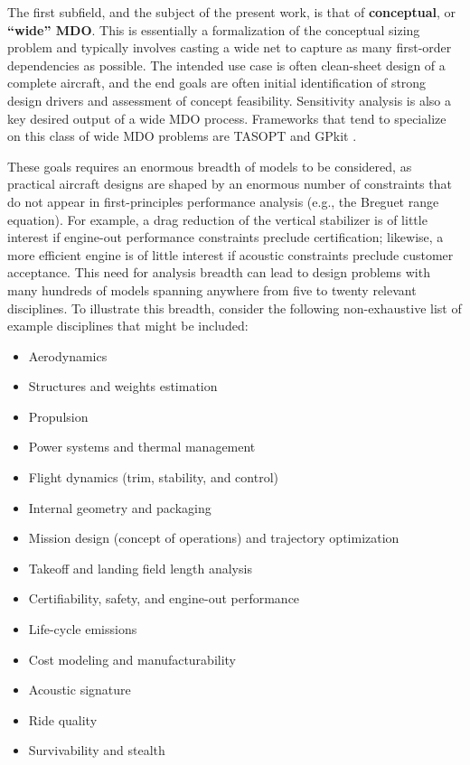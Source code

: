 \documentclass[12pt,vi,oneside,table]{report}
\begin{document}
    The first subfield, and the subject of the present work, is that of \textbf{conceptual}, or \textbf{``wide'' MDO}. This is essentially a formalization of the conceptual sizing problem and typically involves casting a wide net to capture as many first-order dependencies as possible. The intended use case is often clean-sheet design of a complete aircraft, and the end goals are often initial identification of strong design drivers and assessment of concept feasibility. Sensitivity analysis is also a key desired output of a wide MDO process. Frameworks that tend to specialize on this class of wide MDO problems are TASOPT \cite{drela_tasopt_2010} and GPkit \cite{gpkit}.

    These goals requires an enormous breadth of models to be considered, as practical aircraft designs are shaped by an enormous number of constraints that do not appear in first-principles performance analysis (e.g., the Breguet range equation). For example, a drag reduction of the vertical stabilizer is of little interest if engine-out performance constraints preclude certification; likewise, a more efficient engine is of little interest if acoustic constraints preclude customer acceptance. This need for analysis breadth can lead to design problems with many hundreds of models spanning anywhere from five to twenty relevant disciplines. To illustrate this breadth, consider the following non-exhaustive list of example disciplines that might be included:

    \begin{multicols}{2}
        \begin{itemize}[noitemsep]
            \item Aerodynamics
            \item Structures and weights estimation
            \item Propulsion
            \item Power systems and thermal management
            \item Flight dynamics (trim, stability, and control)
            \item Internal geometry and packaging
            \item Mission design (concept of operations) and trajectory optimization
            \item Takeoff and landing field length analysis
            \item Certifiability, safety, and engine-out performance
            \item Life-cycle emissions
            \item Cost modeling and manufacturability
            \item Acoustic signature
            \item Ride quality
            \item Survivability and stealth
        \end{itemize}
    \end{multicols}
\end{document}

